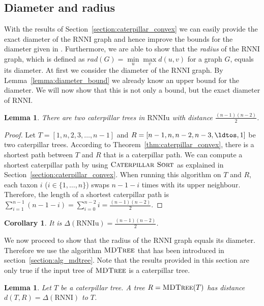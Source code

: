 \documentclass{amsart}
\newcommand{\rnni}{\mathrm{RNNI}}
\newcommand{\rnniu}{\mathrm{RNNIu}}
\newcommand{\csort}{\textsc{Caterpillar Sort}}
\newcommand{\mdtree}{\textsc{MDTree}}
\newtheorem{lemma}[definition]{Lemma}
\newtheorem{corollary}[definition]{Corollary}
\begin{document}
\subsection{Diameter and radius}
\label{section:diameter}

With the results of Section~\ref{section:caterpillar_convex} we can easily provide the exact diameter of the $\rnni$ graph and hence improve the bounds for the diameter given in \autocite{Gavryushkin2018-ol}.
Furthermore, we are able to show that the \emph{radius} of the $\rnni$ graph, which is defined as $rad(G) =  \min\limits_u \max\limits_v d(u,v)$ for a graph $G$, equals its diameter.
At first we consider the diameter of the $\rnni$ graph.
By Lemma~\ref{lemma:diameter_bound} we already know an upper bound for the diameter.
We will now show that this is not only a bound, but the exact diameter of $\rnni$.

\begin{lemma}
	There are two caterpillar trees in $\rnniu$ with distance $\frac{(n-1)(n-2)}{2}$.
	\label{lemma:caterpillar_diameter}
\end{lemma}

\begin{proof}
	Let $T = [1,n,2,3,\ldots,n-1]$ and $R = [n-1,n,n-2,n-3, \ldtos, 1]$ be two caterpillar trees.
    According to Theorem~\ref{thm:caterpillar_convex}, there is a shortest path between $T$ and $R$ that is a caterpillar path.
    We can compute a shortest caterpillar path by using $\csort$ as explained in Section~\ref{section:caterpillar_convex}.
    When running this algorithm on $T$ and $R$, each taxon $i$ ($i \in \{1, \ldots, n\}$) swaps $n-1-i$ times with its upper neighbour.
    Therefore, the length of a shortest caterpillar path is $\sum\limits_{i=1}^{n-1}(n-1-i) = \sum\limits_{i=0}^{n-2}i = \frac{(n-1)(n-2)}{2}$.
\end{proof}

\begin{corollary}
    It is $\Delta(\rnniu) = \frac{(n-1)(n-2)}{2}$.
    \label{corollary:diameter}
\end{corollary}

We now proceed to show that the radius of the $\rnni$ graph equals its diameter.
Therefore we use the algorithm $\mdtree$ that has been introduced in section~\ref{section:alg_mdtree}.
Note that the results provided in this section are only true if the input tree of $\mdtree$ is a caterpillar tree.

\begin{lemma}
    Let $T$ be a caterpillar tree.
    A tree $R = \mdtree(T)$ has distance $d(T,R) = \Delta(\rnni)$ to $T$.
    \label{lemma:max_dist_caterpillar}
\end{lemma}
\end{document}
